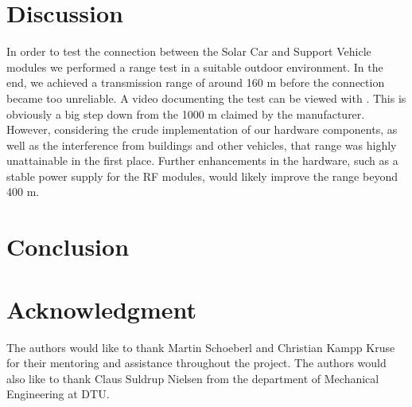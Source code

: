 \documentclass[conference]{IEEEtran}
\newcommand{\MYhref}[3][blue]{\href{#2}{\color{#1}{#3}}}
\begin{document}
\section{Discussion}

In order to test the connection between the Solar Car and Support Vehicle modules we performed a range test in a suitable outdoor environment. In the end, we achieved a transmission range of around 160 m before the connection became too unreliable. A video documenting the test can be viewed with \MYhref{https://youtu.be/-iwST3REn40}{this link}. This is obviously a big step down from the 1000 m claimed by the manufacturer. However, considering the crude implementation of our hardware components, as well as the interference from buildings and other vehicles, that range was highly unattainable in the first place. Further enhancements in the hardware, such as a stable power supply for the RF modules, would likely improve the range beyond 400 m. 
 

\section{Conclusion}



\section*{Acknowledgment}
The authors would like to thank Martin Schoeberl and Christian Kampp Kruse for their mentoring and assistance throughout the project. The authors would also like to thank Claus Suldrup Nielsen from the department of Mechanical Engineering at DTU.


\printbibliography
\end{document}

